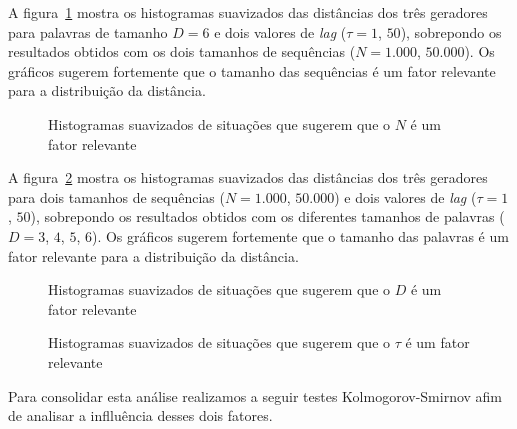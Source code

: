 A figura~\ref{fig:NRelevante} mostra os histogramas suavizados das distâncias dos três geradores para palavras de tamanho $D=6$ e dois valores de \textit{lag} ($\tau=1$, $50$), sobrepondo os resultados obtidos com os dois tamanhos de sequências ($N=1.000$, $50.000$).
Os gráficos sugerem fortemente que o tamanho das sequências é um fator relevante para a distribuição da distância.

\begin{figure}
\centering
{}
\caption{Histogramas suavizados de situações que sugerem que o $N$ é um fator relevante}\label{fig:NRelevante}
\end{figure}

A figura~\ref{fig:DRelevante} mostra os histogramas suavizados das distâncias dos três geradores para dois tamanhos de sequências ($N=1.000$, $50.000$) e dois valores de \textit{lag} ($\tau=1$, $50$), sobrepondo os resultados obtidos com os diferentes tamanhos de palavras ($D=3$, $4$, $5$, $6$).
Os gráficos sugerem fortemente que o tamanho das palavras é um fator relevante para a distribuição da distância.

\begin{figure}
\centering
{}
\caption{Histogramas suavizados de situações que sugerem que o $D$ é um fator relevante}\label{fig:DRelevante}
\end{figure}


\begin{figure}
\centering
{}
\caption{Histogramas suavizados de situações que sugerem que o $\tau$ é um fator relevante}\label{fig:tRelevante}
\end{figure}

Para consolidar esta análise realizamos a seguir testes Kolmogorov-Smirnov afim de analisar a inflluência desses dois fatores.

